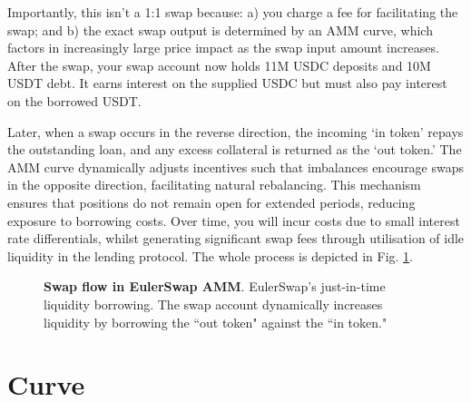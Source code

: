 \documentclass{article}
\begin{document}
\quad
Importantly, this isn’t a 1:1 swap because: a) you charge a fee for facilitating the swap; and b) the exact swap output is determined by an AMM curve, which factors in increasingly large price impact as the swap input amount increases. After the swap, your swap account now holds 11M USDC deposits and 10M USDT debt. It earns interest on the supplied USDC but must also pay interest on the borrowed USDT.

Later, when a swap occurs in the reverse direction, the incoming `in token' repays the outstanding loan, and any excess collateral is returned as the `out token.' The AMM curve dynamically adjusts incentives such that imbalances encourage swaps in the opposite direction, facilitating natural rebalancing. This mechanism ensures that positions do not remain open for extended periods, reducing exposure to borrowing costs. Over time, you will incur costs due to small interest rate differentials, whilst generating significant swap fees through utilisation of idle liquidity in the lending protocol. The whole process is depicted in Fig. \ref{fig:EulerSwap_liquidity}.

\bigskip
\begin{figure}[h]
    \centering
    \caption{\textbf{Swap flow in EulerSwap AMM}. EulerSwap’s just-in-time liquidity borrowing. The swap account dynamically increases liquidity by borrowing the ``out token" against the ``in token."}
    \label{fig:EulerSwap_liquidity}
\end{figure}

\section{Curve}
\end{document}
